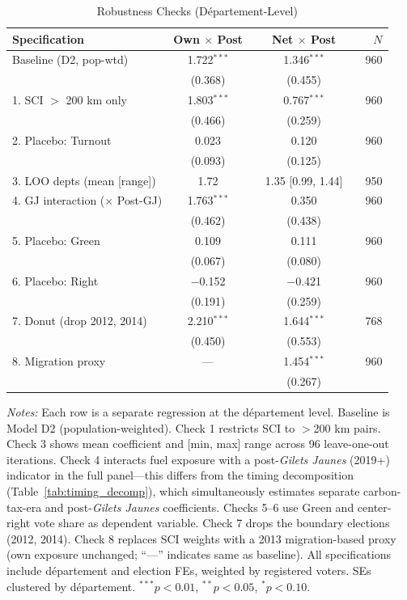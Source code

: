 \documentclass[12pt]{article}
\newcommand{\gj}{\textit{Gilets Jaunes}}
\newcommand{\dept}{d\'{e}partement}
\begin{document}
\begin{table}[H]
\centering
\caption{Robustness Checks (D\'{e}partement-Level)}
\label{tab:robustness}
\begin{threeparttable}
\begin{tabular}{@{}lccccr@{}}
\toprule
Specification & Own $\times$ Post & & Net $\times$ Post & & $N$ \\
\midrule
Baseline (D2, pop-wtd)  & 1.722$^{***}$ & & 1.346$^{***}$ & & 960 \\
                     & (0.368) & & (0.455) & & \\[3pt]
1. SCI $>$ 200 km only   & 1.803$^{***}$ & & 0.767$^{***}$ & & 960 \\
                     & (0.466) & & (0.259) & & \\[3pt]
2. Placebo: Turnout  & 0.023 & & 0.120 & & 960 \\
                     & (0.093) & & (0.125) & & \\[3pt]
3. LOO depts (mean [range])  & 1.72 & & 1.35 [0.99, 1.44] & & 950 \\[3pt]
4. GJ interaction ($\times$ Post-GJ)  & 1.763$^{***}$ & & 0.350 & & 960 \\
                     & (0.462) & & (0.438) & & \\[3pt]
5. Placebo: Green     & 0.109 & & 0.111 & & 960 \\
                     & (0.067) & & (0.080) & & \\[3pt]
6. Placebo: Right     & $-$0.152 & & $-$0.421 & & 960 \\
                     & (0.191) & & (0.259) & & \\[3pt]
7. Donut (drop 2012, 2014) & 2.210$^{***}$ & & 1.644$^{***}$ & & 768 \\
                     & (0.450) & & (0.553) & & \\[3pt]
8. Migration proxy    & --- & & 1.454$^{***}$ & & 960 \\
                     & & & (0.267) & & \\
\bottomrule
\end{tabular}
\begin{tablenotes}
\small
\item \textit{Notes:} Each row is a separate regression at the \dept{} level. Baseline is Model D2 (population-weighted). Check 1 restricts SCI to $>$200 km pairs. Check 3 shows mean coefficient and [min, max] range across 96 leave-one-out iterations. Check 4 interacts fuel exposure with a post-\gj{} (2019+) indicator in the full panel---this differs from the timing decomposition (Table~\ref{tab:timing_decomp}), which simultaneously estimates separate carbon-tax-era and post-\gj{} coefficients. Checks 5--6 use Green and center-right vote share as dependent variable. Check 7 drops the boundary elections (2012, 2014). Check 8 replaces SCI weights with a 2013 migration-based proxy (own exposure unchanged; ``---'' indicates same as baseline). All specifications include \dept{} and election FEs, weighted by registered voters. SEs clustered by \dept{}. $^{***}p<0.01$, $^{**}p<0.05$, $^{*}p<0.10$.
\end{tablenotes}
\end{threeparttable}
\end{table}
\end{document}
